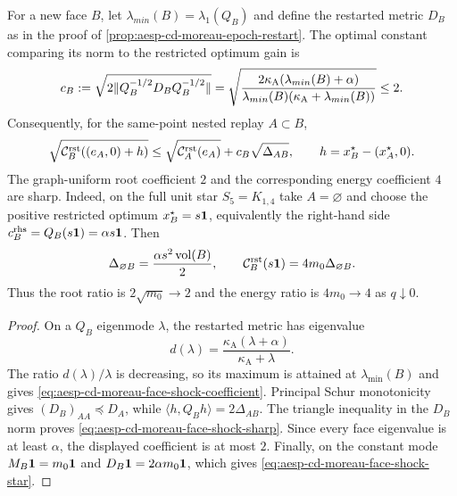 \begin{proposition}
\label{prop:aesp-cd-moreau-face-shock-sharp}
For a new face $B$, let
$\lambda_{min}(B)=\lambda_1(Q_B)$ and define the restarted metric $D_B$ as
in the proof of \cref{prop:aesp-cd-moreau-epoch-restart}.  The optimal
constant comparing its norm to the restricted optimum gain is
\begin{equation}
 c_B:=\sqrt{2\lVert Q_B^{-1/2}D_BQ_B^{-1/2}\rVert}
 =\sqrt{\frac{2\kappa_{\mathrm A}
   (\lambda_{min}(B)+\alpha)}
  {\lambda_{min}(B)(\kappa_{\mathrm A}+\lambda_{min}(B))}}
 \leq2.
 \label{eq:aesp-cd-moreau-face-shock-coefficient}
\end{equation}
Consequently, for the same-point nested replay $A\subset B$,
\begin{equation}
 \sqrt{\mathcal C_B^{\rm rst}((e_A,0)+h)}
 \leq\sqrt{\mathcal C_A^{\rm rst}(e_A)}
      +c_B\sqrt{\Delta_{AB}},
 \qquad h=x_B^\star-(x_A^\star,0).
 \label{eq:aesp-cd-moreau-face-shock-sharp}
\end{equation}
The graph-uniform root coefficient $2$ and the corresponding energy
coefficient $4$ are sharp.  Indeed, on the full unit star $S_5=K_{1,4}$
take $A=\varnothing$ and choose the positive restricted optimum
$x_B^\star=s\mathbf{1}$, equivalently the right-hand side
$c_B^{\rm rhs}=Q_B(s\mathbf{1})=\alpha s\mathbf{1}$.  Then
\begin{equation}
 \Delta_{\varnothing B}=\frac{\alpha s^2\operatorname{vol}(B)}2,
 \qquad
 \mathcal C_B^{\rm rst}(s\mathbf{1})=4m_0\Delta_{\varnothing B}.
 \label{eq:aesp-cd-moreau-face-shock-star}
\end{equation}
Thus the root ratio is $2\sqrt{m_0}\to2$ and the energy ratio is
$4m_0\to4$ as $q\downarrow0$.
\end{proposition}

\begin{proof}
On a $Q_B$ eigenmode $\lambda$, the restarted metric has eigenvalue
\begin{equation*}
 d(\lambda)
 =\frac{\kappa_{\mathrm A}(\lambda+\alpha)}
        {\kappa_{\mathrm A}+\lambda}.
\end{equation*}
The ratio $d(\lambda)/\lambda$ is decreasing, so its maximum is attained at
$\lambda_{\min}(B)$ and gives
\cref{eq:aesp-cd-moreau-face-shock-coefficient}.  Principal Schur
monotonicity gives $(D_B)_{AA}\preceq D_A$, while
$\langle h,Q_Bh\rangle=2\Delta_{AB}$.  The triangle inequality in the
$D_B$ norm proves \cref{eq:aesp-cd-moreau-face-shock-sharp}.  Since every
face eigenvalue is at least $\alpha$, the displayed coefficient is at most
$2$.  Finally, on the constant mode $M_B\mathbf{1}=m_0\mathbf{1}$ and
$D_B\mathbf{1}=2\alpha m_0\mathbf{1}$, which gives
\cref{eq:aesp-cd-moreau-face-shock-star}.
\end{proof}

